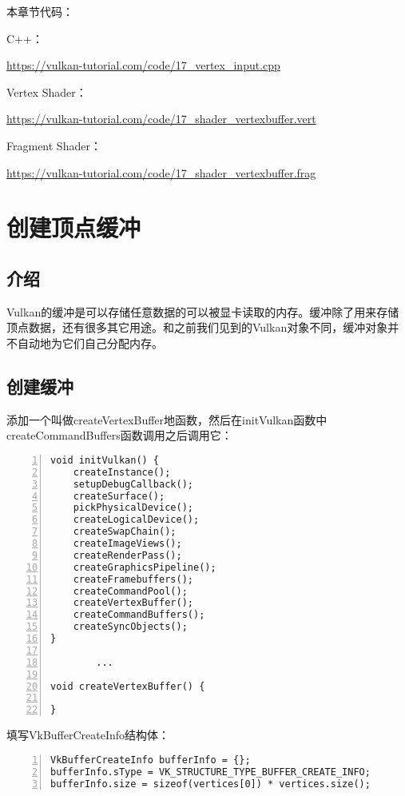 \documentclass{ctexart}
\begin{document}
本章节代码：

C++：

\url{https://vulkan-tutorial.com/code/17_vertex_input.cpp}

Vertex Shader：

\url{https://vulkan-tutorial.com/code/17_shader_vertexbuffer.vert}

Fragment Shader：

\url{https://vulkan-tutorial.com/code/17_shader_vertexbuffer.frag}

\newpage
\section{创建顶点缓冲}

\subsection{介绍}

Vulkan的缓冲是可以存储任意数据的可以被显卡读取的内存。缓冲除了用来存储顶点数据，还有很多其它用途。和之前我们见到的Vulkan对象不同，缓冲对象并不自动地为它们自己分配内存。

\subsection{创建缓冲}

添加一个叫做createVertexBuffer地函数，然后在initVulkan函数中createCommandBuffers函数调用之后调用它：

\begin{lstlisting}[language={[ANSI]C},keywordstyle=\color{blue!70},commentstyle=\color{red!50!green!50!blue!50},frame=shadowbox, rulesepcolor=\color{red!20!green!20!blue!20},basicstyle=\small,numbers=left, numberstyle=\tiny,breaklines=true]
void initVulkan() {
	createInstance();
	setupDebugCallback();
	createSurface();
	pickPhysicalDevice();
	createLogicalDevice();
	createSwapChain();
	createImageViews();
	createRenderPass();
	createGraphicsPipeline();
	createFramebuffers();
	createCommandPool();
	createVertexBuffer();
	createCommandBuffers();
	createSyncObjects();
}

		...

void createVertexBuffer() {

}
\end{lstlisting}

填写VkBufferCreateInfo结构体：

\begin{lstlisting}[language={[ANSI]C},keywordstyle=\color{blue!70},commentstyle=\color{red!50!green!50!blue!50},frame=shadowbox, rulesepcolor=\color{red!20!green!20!blue!20},basicstyle=\small,numbers=left, numberstyle=\tiny,breaklines=true]
VkBufferCreateInfo bufferInfo = {};
bufferInfo.sType = VK_STRUCTURE_TYPE_BUFFER_CREATE_INFO;
bufferInfo.size = sizeof(vertices[0]) * vertices.size();
\end{lstlisting}
\end{document}
